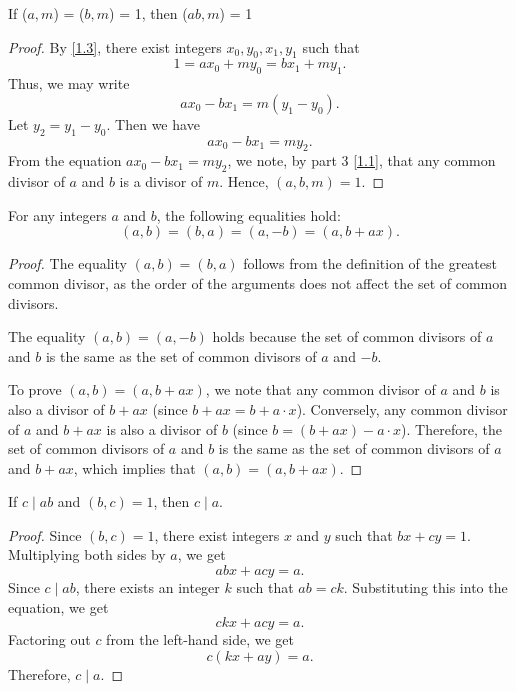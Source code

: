\documentclass[11pt]{article}
\begin{document}
\begin{theorem}\label{1.8}
    If (\(a, m\)) = (\(b, m\)) = 1, then (\(ab, m\)) = 1
\end{theorem}
\begin{proof}
    By \cref{1.3}, there exist integers \(x_0, y_0, x_1, y_1\) such that
    \[1 = ax_0 + my_0 = bx_1 + my_1.\]
    Thus, we may write
    \[
        a x_0 - b x_1 = m (y_1 - y_0).
    \]
    Let \(y_2 = y_1 - y_0\). Then we have
    \[
        a x_0 - b x_1 = m y_2.
    \]
    From the equation \(a x_0 - b x_1 = m y_2\), we note, by part 3 \cref{1.1}, that any common divisor of \(a\) and \(b\) is a divisor of \(m\).
    Hence, \((a, b, m) = 1\).
\end{proof}
\begin{theorem}\label{1.9}
    For any integers \(a\) and \(b\), the following equalities hold:
    \[
        (a, b) = (b, a) = (a, -b) = (a, b + ax).
    \]
\end{theorem}
\begin{proof}
    The equality \((a, b) = (b, a)\) follows from the definition of the greatest common divisor, as the order of the arguments does not affect the set of common divisors.

    The equality \((a, b) = (a, -b)\) holds because the set of common divisors of
    \(a\) and \(b\) is the same as the set of common divisors of \(a\) and \(-b\).

    To prove \((a, b) = (a, b + ax)\), we note that any common divisor of \(a\) and
    \(b\) is also a divisor of \(b + ax\) (since \(b + ax = b + a \cdot x\)).
    Conversely, any common divisor of \(a\) and \(b + ax\) is also a divisor of
    \(b\) (since \(b = (b + ax) - a \cdot x\)). Therefore, the set of common
    divisors of \(a\) and \(b\) is the same as the set of common divisors of \(a\)
    and \(b + ax\), which implies that \((a, b) = (a, b + ax)\).
\end{proof}
\begin{theorem}\label{1.10}
    If \(c \mid ab\) and \((b, c) = 1\), then \(c \mid a\).
\end{theorem}

\begin{proof}
    Since \((b, c) = 1\), there exist integers \(x\) and \(y\) such that \(bx + cy = 1\). Multiplying both sides by \(a\), we get
    \[
        abx + acy = a.
    \]
    Since \(c \mid ab\), there exists an integer \(k\) such that \(ab = ck\).
    Substituting this into the equation, we get
    \[
        ckx + acy = a.
    \]
    Factoring out \(c\) from the left-hand side, we get
    \[
        c(kx + ay) = a.
    \]
    Therefore, \(c \mid a\).
\end{proof}
\end{document}
